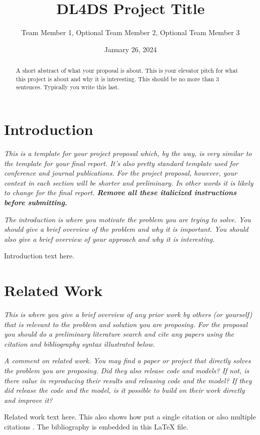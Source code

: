 \documentclass[11pt, oneside]{article}   	%
\title{DL4DS Project Title}
\author{Team Member 1, Optional Team Member 2, Optional Team Member 3}
\date{January 26, 2024}		%
\begin{document}
\maketitle
\begin{abstract}
	A short abstract of what your proposal is about. This is your elevator pitch
	for what this project is about and why it is interesting. This should be no
	more than 3 sentences. Typically you write this last.
\end{abstract}

\section*{Introduction}

\textit{This is a template for your project proposal which, by the way,
	is very similar to the template for your final report. It's also pretty
	standard template used for conference and journal publications. For the
	project proposal, however, your context in each section will be shorter
	and preliminary. In other words it is likely to change for the final
	report.
	\textbf{Remove all these italicized instructions before submitting.}}

\textit{The introduction is where you motivate the problem you are trying
	to solve. You should give a brief overview of the problem and why it is
	important. You should also give a brief overview of your approach and
	why it is interesting.}

Introduction text here.

\section*{Related Work}

\textit{This is where you give a brief overview of any prior work by
	others (or yourself) that is relevant to the problem and solution you
	are proposing. For the proposal you should do a preliminary literature search
	and cite any papers using the citation and bibliography syntax illustrated
	below.}

\textit{A comment on related work. You may find a paper or project that
	directly solves the problem you are proposing. Did they also release code and
	models? If not, is there value in reproducing their results and releasing
	code and the model?
	If they did release the code and the model, is it possible to build
	on their work directly and improve it?}

Related work text here. This also shows how put a single
citation \cite{citation_key1} or also multiple citations
\cite{citation_key1,citation_key2}.  The bibliography is embedded
in this \LaTeX \hspace*{1pt} file.
\end{document}
